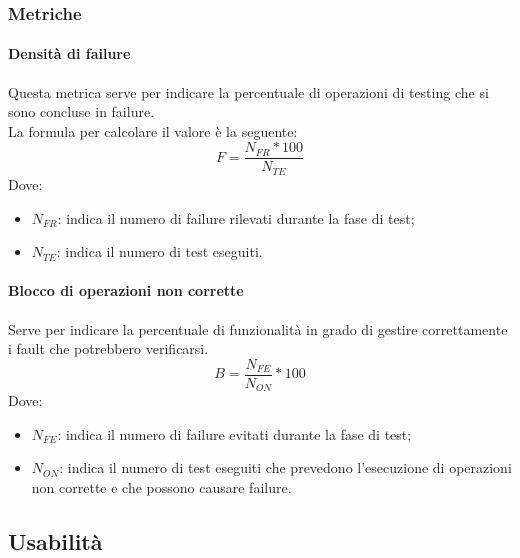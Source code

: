 \documentclass[../PianoDiQualifica.tex]{subfiles}
\begin{document}
				\subsubsection{Metriche}
				\paragraph{Densità di failure}
				Questa metrica serve per indicare la percentuale di operazioni di testing che si sono concluse in failure. \\La formula per calcolare il valore è la seguente:
				\begin{equation*}
					F = \frac{N_{FR} * 100}{N_{TE}}
				\end{equation*}
				Dove:
				\begin{itemize}
					\item \textbf{$N_{FR}$}: indica il numero di failure rilevati durante la fase di test;
					\item \textbf{$N_{TE}$}: indica il numero di test eseguiti.
				\end{itemize}
				
				\paragraph{Blocco di operazioni non corrette}
				Serve per indicare la percentuale di funzionalità in grado di gestire correttamente i fault che potrebbero verificarsi.
				\begin{equation*}
					B = \frac{N_{FE}}{N_{ON}} * 100
				\end{equation*}
				Dove:
				\begin{itemize}
					\item \textbf{$N_{FE}$}: indica il numero di failure evitati durante la fase di test;
					\item \textbf{$N_{ON}$}: indica il numero di test eseguiti che prevedono l'esecuzione di operazioni non corrette e che possono causare failure.
				\end{itemize}
			
			
			\subsection{Usabilità}
\end{document}

